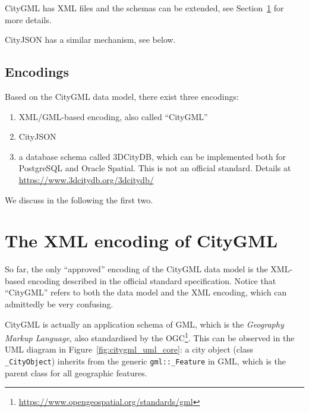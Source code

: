 CityGML has XML files and the schemas can be extended, see Section~\ref{sec:citygmlxml} for more details. 

CityJSON has a similar mechanism, see below.








\subsection{Encodings}

Based on the CityGML data model, there exist three encodings:
\begin{enumerate}
  \item XML/GML-based encoding, also called ``CityGML''
  \item CityJSON
  \item a database schema called 3DCityDB, which can be implemented both for PostgreSQL and Oracle Spatial. This is not an official standard. Details at \url{https://www.3dcitydb.org/3dcitydb/}
\end{enumerate}
We discuss in the following the first two.


\section{The XML encoding of CityGML}
\label{sec:citygmlxml}

So far, the only ``approved'' encoding of the CityGML data model is the XML-based encoding described in the official standard specification.
Notice that ``CityGML'' refers to both the data model and the XML encoding, which can admittedly be very confusing.

%

CityGML is actually an application schema of GML, which is the \emph{Geography Markup Language}, also standardised by the OGC\footnote{\url{https://www.opengeospatial.org/standards/gml}}.
This can be observed in the UML diagram in Figure~\ref{fig:citygml_uml_core}: a city object (class \texttt{\_CityObject}) inherits from the generic \texttt{gml::\_Feature} in GML, which is the parent class for all geographic features.
  
